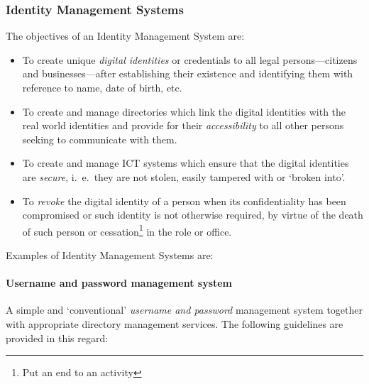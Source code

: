  \subsubsection*{Identity Management Systems} 
 The objectives of an Identity Management System are:
 \begin{itemize}
 	\item To create unique \textit{digital identities} or credentials to all legal persons—citizens
 	and businesses—after establishing their existence and identifying them with
 	reference to name, date of birth, etc.
 	
 	\item To create and manage directories which link the digital identities with the real world identities and provide for their \textit{accessibility} to all other persons seeking to
 	communicate with them.
 	
 	\item  To create and manage ICT systems which ensure that the digital identities are \textit{secure}, i.\ e.\ they are not stolen, easily tampered with or ‘broken into'.
 	
	\item To \textit{revoke} the digital identity of a person when its confidentiality has been compromised or such identity is not otherwise required, by virtue of the death of such person or cessation\footnote{Put an end to an activity} in the role or office.
 \end{itemize}
 
 Examples of Identity Management Systems are:
\paragraph*{Username and password management system}

 A simple and `conventional' \textit{username and password} management system together with appropriate directory management services. The following
 guidelines are provided in this regard:
 

